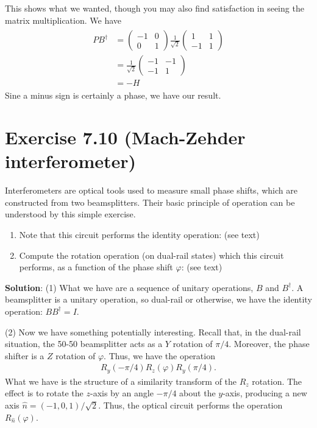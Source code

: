 \documentclass{book}
\begin{document}
    This shows what we wanted, though you may also find satisfaction in seeing the matrix multiplication. We have
    \begin{align}
    \begin{aligned}
        P B^\dagger &= \begin{pmatrix}
            -1 & 0 \\
            0 & 1
        \end{pmatrix} \frac{1}{\sqrt{2}} \begin{pmatrix}
            1 & 1 \\
            -1 & 1
        \end{pmatrix} \\[1.5ex]
        &= \frac{1}{\sqrt{2}} \begin{pmatrix}
            -1 & -1 \\
            -1 & 1
        \end{pmatrix} \\
        &= - H
    \end{aligned}
    \end{align}
    Sine a minus sign is certainly a phase, we have our result.

\section*{Exercise 7.10 (Mach-Zehder interferometer)}
    Interferometers are optical tools used to measure small phase shifts, which are constructed from two beamsplitters. Their basic principle of operation can be understood by this simple exercise.
    \begin{enumerate}
        \item Note that this circuit performs the identity operation: (see text)
        \item Compute the rotation operation (on dual-rail states) which this circuit performs, as a function of the phase shift $\varphi$: (see text)
    \end{enumerate}
    
    \textbf{Solution}: (1) What we have are a sequence of unitary operations, $B$ and $B^\dagger$. A beamsplitter is a unitary operation, so dual-rail or otherwise, we have the identity operation: $BB^\dagger = I$.

    (2) Now we have something potentially interesting. Recall that, in the dual-rail situation, the 50-50 beamsplitter acts as a $Y$ rotation of $\pi/4$. Moreover, the phase shifter is a $Z$ rotation of $\varphi$. Thus, we have the operation
    \begin{align} \label{eq:7.10}
        R_y(-\pi/4) R_z(\varphi) R_y(\pi/4).
    \end{align}
    What we have is the structure of a similarity transform of the $R_z$ rotation. The effect is to rotate the $z$-axis by an angle $-\pi/4$ about the $y$-axis, producing a new axis $\hat{n} = (-1,0,1)/\sqrt{2}$. Thus, the optical circuit performs the operation $R_{\hat{n}}(\varphi)$.
\end{document}
